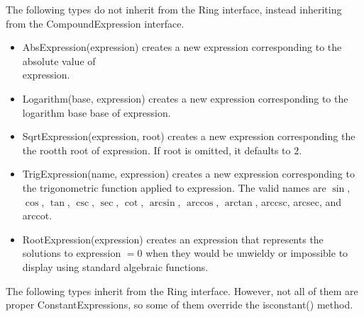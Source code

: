 \documentclass{article}
\begin{document}
The following types do not inherit from the {\ttfamily Ring} interface, instead inheriting from the {\ttfamily CompoundExpression} interface.

\begin{itemize}
    \item {\ttfamily AbsExpression(expression)} creates a new expression corresponding to the absolute value of \\ {\ttfamily expression}.
    \item {\ttfamily Logarithm(base, expression)} creates a new expression corresponding to the logarithm base {\ttfamily base} of {\ttfamily expression}.
    \item {\ttfamily SqrtExpression(expression, root)} creates a new expression corresponding the the {\ttfamily root}th root of {\ttfamily expression}. If {\ttfamily root} is omitted, it defaults to $2$.
    \item {\ttfamily TrigExpression(name, expression)} creates a new expression corresponding to the trigonometric function applied to {\ttfamily expression}. The valid names are $\sin$, $\cos$, $\tan$, $\csc$, $\sec$, $\cot$, $\arcsin$, $\arccos$, $\arctan$, arccsc, arcsec, and arccot.
    
    \item {\ttfamily RootExpression(expression)} creates an expression that represents the solutions to {\ttfamily expression} $= 0$ when they would be unwieldy or impossible to display using standard algebraic functions.
\end{itemize}


The following types inherit from the {\ttfamily Ring} interface. However, not all of them are proper {\ttfamily ConstantExpression}s, so some of them override the {\ttfamily isconstant()} method.
\end{document}
